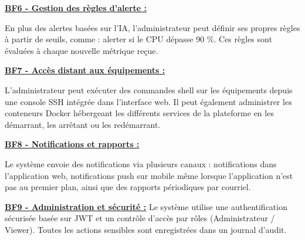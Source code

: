 \documentclass[12pt,a4paper]{report}
\newcommand{\ub}[1]{\uline{\textbf{#1}}}
\begin{document}
\ub{BF6 - Gestion des règles d'alerte :}\par
En plus des alertes basées sur l’IA, l’administrateur peut définir ses propres règles à partir de seuils, comme : alerter si le CPU dépasse 90 \%. Ces règles sont évaluées à chaque nouvelle métrique reçue.\par
\ub{BF7 - Accès distant aux équipements :}\par
L’administrateur peut exécuter des commandes shell sur les équipements depuis une console SSH intégrée dans l’interface web. Il peut également administrer les conteneurs Docker hébergeant les différents services de la plateforme en les démarrant, les arrêtant ou les redémarrant.\par
\ub{BF8 - Notifications et rapports :}\par
Le système envoie des notifications via plusieurs canaux : notifications dans l’application web, notifications push sur mobile même lorsque l’application n’est pas au premier plan, ainsi que des rapports périodiques par courriel.\par
\ub{BF9 - Administration et sécurité :} Le système utilise une authentification sécurisée basée sur JWT et un contrôle d’accès par rôles (Administrateur / Viewer). Toutes les actions sensibles sont enregistrées dans un journal d’audit.\par
\Needspace{0.63\textheight}
\end{document}
